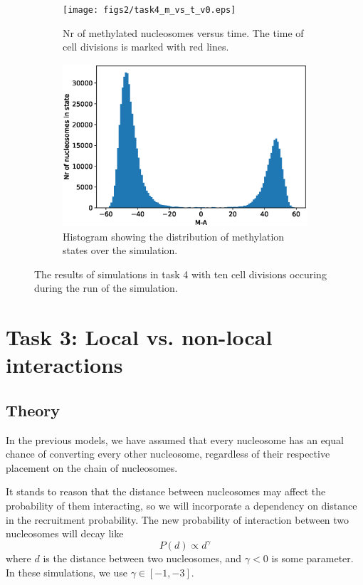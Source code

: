 \documentclass[fleqn,10pt]{SelfArx} %
\begin{document}
\begin{figure}[ht!]
	\centering
	\begin{subfigure}[b]{.49\textwidth}
		\centering
		\texttt{[image: figs2/task4\_m\_vs\_t\_v0.eps]}
		\caption{Nr of methylated nucleosomes versus time. The time of cell divisions is marked with red lines. }
		\label{fig:task4_m_vs_t}
	\end{subfigure}
	\begin{subfigure}[b]{.49\textwidth}
		\centering
		\includegraphics[width= \linewidth]{figs2/task4_hist_v0.eps}
		\caption{Histogram showing the distribution of methylation states over the simulation.}
		\label{fig:task4_hist}
	\end{subfigure}
		\caption{The results of simulations in task 4 with ten cell divisions occuring during the run of the simulation. }
		\label{fig:task4}
\end{figure}

\section{Task 3: Local vs. non-local interactions}
\subsection{Theory}
In the previous models, we have assumed that every nucleosome has an equal chance of converting every other nucleosome, regardless of their respective placement on the chain of nucleosomes. 

It stands to reason that the distance between nucleosomes may affect the probability of them interacting, so we will incorporate a dependency on distance in the recruitment probability. The new probability of interaction between two nucleosomes will decay like 
\begin{equation}
	P(d) \propto d^\gamma
\end{equation}
where $d$ is the distance between two nucleosomes, and $\gamma <0$ is some parameter. In these simulations, 
we use $\gamma\in [-1,-3]$. 
\end{document}
